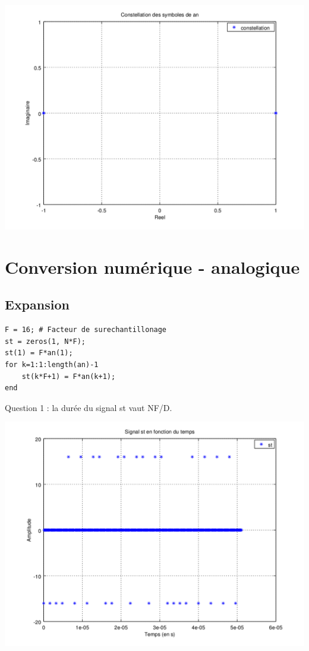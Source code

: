 \documentclass{acm_proc_article-sp}
\begin{document}
\begin{center}
\includegraphics[scale=0.45]{constell_2.png}
\end{center}


\section{Conversion numérique - analogique}
\subsection{Expansion}

\begin{lstlisting}
F = 16; # Facteur de surechantillonage
st = zeros(1, N*F);
st(1) = F*an(1);
for k=1:1:length(an)-1
    st(k*F+1) = F*an(k+1);
end
\end{lstlisting}

Question 1 : la durée du signal st vaut NF/D.

\begin{center}
\includegraphics[scale=0.45]{st_3.png}
\end{center}
\end{document}
